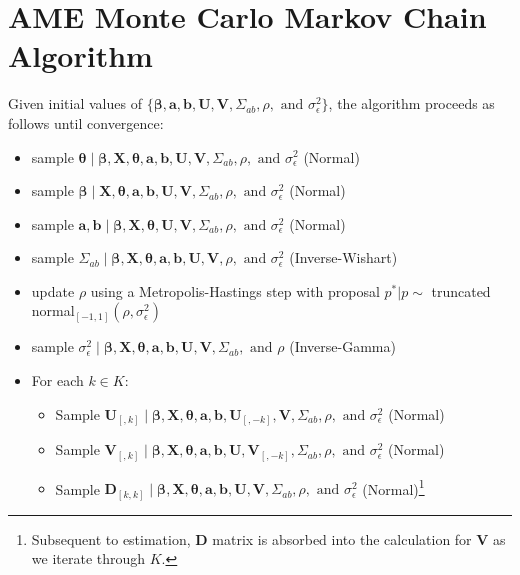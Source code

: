 \clearpage

\renewcommand{\thefigure}{\arabic{figure}}
\setcounter{figure}{0}
\renewcommand{\thetable}{\thesection \arabic{table}}
\setcounter{table}{0}
\setcounter{section}{0}

\appendix
\section{AME Monte Carlo Markov Chain Algorithm}

Given initial values of $\{\bm\beta, \mathbf{a}, \mathbf{b}, \mathbf{U}, \mathbf{V}, \Sigma_{ab}, \rho, \text{ and } \sigma_{\epsilon}^{2}\}$, the algorithm proceeds as follows until convergence:

 \begin{itemize}
  \item sample $\bm\theta \; | \;  \bm\beta, \mathbf{X}, \bm\theta, \mathbf{a}, \mathbf{b}, \mathbf{U}, \mathbf{V}, \Sigma_{ab}, \rho, \text{ and } \sigma_{\epsilon}^{2}$ (Normal)
  \item sample $\bm\beta \; | \;  \mathbf{X}, \bm\theta, \mathbf{a}, \mathbf{b}, \mathbf{U}, \mathbf{V}, \Sigma_{ab}, \rho, \text{ and } \sigma_{\epsilon}^{2}$ (Normal)
  \item sample $\mathbf{a}, \mathbf{b} \; | \; \bm\beta, \mathbf{X}, \bm\theta, \mathbf{U}, \mathbf{V}, \Sigma_{ab}, \rho, \text{ and } \sigma_{\epsilon}^{2}$ (Normal)
  \item sample $\Sigma_{ab} \; | \; \bm\beta, \mathbf{X}, \bm\theta, \mathbf{a}, \mathbf{b}, \mathbf{U}, \mathbf{V}, \rho, \text{ and } \sigma_{\epsilon}^{2}$ (Inverse-Wishart)
  \item update $\rho$ using a Metropolis-Hastings step with proposal $p^{*} | p  \sim$ truncated normal$_{[-1,1]}(\rho, \sigma_{\epsilon}^{2})$
  \item sample $\sigma_{\epsilon}^{2} \; | \; \bm\beta, \mathbf{X}, \bm\theta, \mathbf{a}, \mathbf{b}, \mathbf{U}, \mathbf{V}, \Sigma_{ab}, \text{ and } \rho$ (Inverse-Gamma)
  \item For each $k \in K$:
  \begin{itemize}
    \item Sample $\mathbf{U}_{[,k]} \; | \; \bm\beta, \mathbf{X}, \bm\theta, \mathbf{a}, \mathbf{b}, \mathbf{U}_{[,-k]}, \mathbf{V}, \Sigma_{ab}, \rho, \text{ and } \sigma_{\epsilon}^{2}$ (Normal)
    \item Sample $\mathbf{V}_{[,k]} \; | \; \bm\beta, \mathbf{X}, \bm\theta, \mathbf{a}, \mathbf{b}, \mathbf{U}, \mathbf{V}_{[,-k]}, \Sigma_{ab}, \rho, \text{ and } \sigma_{\epsilon}^{2}$ (Normal)
    \item Sample $\mathbf{D}_{[k,k]}  \; | \; \bm\beta, \mathbf{X}, \bm\theta,\mathbf{a}, \mathbf{b}, \mathbf{U}, \mathbf{V}, \Sigma_{ab}, \rho, \text{ and } \sigma_{\epsilon}^{2}$ (Normal)\footnote{Subsequent to estimation, $\mathbf{D}$ matrix is absorbed into the calculation for $\mathbf{V}$ as we iterate through $K$. }
  \end{itemize}
 \end{itemize}
\newpage
